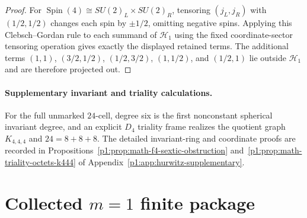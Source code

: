 \documentclass[11pt]{article}
\begin{document}
\begin{proof}
For \(\operatorname{Spin}(4)\cong SU(2)_L\times SU(2)_R\), tensoring \((j_L,j_R)\) with \((1/2,1/2)\) changes each spin by \(\pm1/2\), omitting negative spins.  Applying this Clebsch--Gordan rule to each summand of \(\mathcal H_1\) using the fixed coordinate-sector tensoring operation gives exactly the displayed retained terms.  The additional terms \((1,1)\), \((3/2,1/2)\), \((1/2,3/2)\), \((1,1/2)\), and \((1/2,1)\) lie outside \(\mathcal H_1\) and are therefore projected out.
\end{proof}

\paragraph{Supplementary invariant and triality calculations.}
For the full unmarked \(24\)-cell, degree six is the first nonconstant
spherical invariant degree, and an explicit \(D_4\) triality frame realizes
the quotient graph \(K_{4,4,4}\) and \(24=8+8+8\).  The detailed
invariant-ring and coordinate proofs are recorded in
Propositions~\ref{p1:prop:math-f4-sextic-obstruction}
and~\ref{p1:prop:math-triality-octets-k444} of
Appendix~\ref{p1:app:hurwitz-supplementary}.


\section{Collected \texorpdfstring{\(m=1\)}{m=1} finite package}
\label{p1:sec:s3one-summary}
\end{document}
